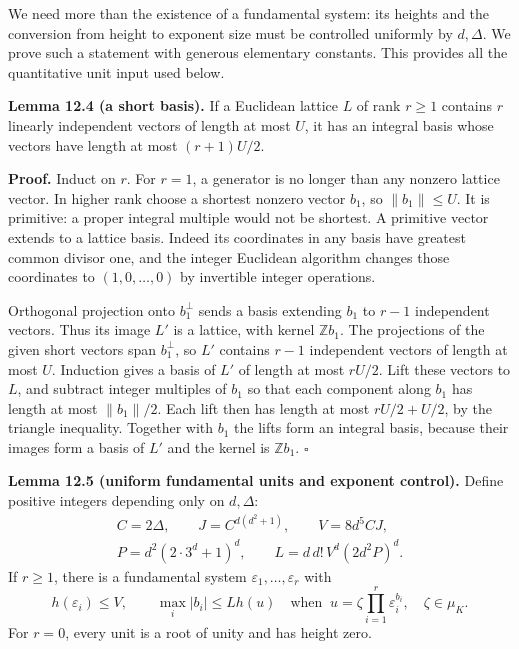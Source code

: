 \documentclass[
  11pt,
  a4paper,
]{article}
\begin{document}
We need more than the existence of a fundamental system: its heights and
the conversion from height to exponent size must be controlled uniformly
by \(d,\Delta\). We prove such a statement with generous elementary
constants. This provides all the quantitative unit input used below.

\textbf{Lemma 12.4 (a short basis).} If a Euclidean lattice \(L\) of
rank \(r\ge1\) contains \(r\) linearly independent vectors of length at
most \(U\), it has an integral basis whose vectors have length at most
\((r+1)U/2\).

\textbf{Proof.} Induct on \(r\). For \(r=1\), a generator is no longer
than any nonzero lattice vector. In higher rank choose a shortest
nonzero vector \(b_1\), so \(\|b_1\|\le U\). It is primitive: a proper
integral multiple would not be shortest. A primitive vector extends to a
lattice basis. Indeed its coordinates in any basis have greatest common
divisor one, and the integer Euclidean algorithm changes those
coordinates to \((1,0,\ldots,0)\) by invertible integer operations.

Orthogonal projection onto \(b_1^\perp\) sends a basis extending \(b_1\)
to \(r-1\) independent vectors. Thus its image \(L'\) is a lattice, with
kernel \(\mathbb Zb_1\). The projections of the given short vectors span
\(b_1^\perp\), so \(L'\) contains \(r-1\) independent vectors of length
at most \(U\). Induction gives a basis of \(L'\) of length at most
\(rU/2\). Lift these vectors to \(L\), and subtract integer multiples of
\(b_1\) so that each component along \(b_1\) has length at most
\(\|b_1\|/2\). Each lift then has length at most \(rU/2+U/2\), by the
triangle inequality. Together with \(b_1\) the lifts form an integral
basis, because their images form a basis of \(L'\) and the kernel is
\(\mathbb Zb_1\). \(\square\)

\textbf{Lemma 12.5 (uniform fundamental units and exponent control).}
Define positive integers depending only on \(d,\Delta\): \[
\begin{gathered}
C=2\Delta,\qquad J=C^{d(d^2+1)},\qquad V=8d^5CJ,\\
P=d^2(2\cdot3^d+1)^d,\qquad
L=d\,d!\,V^d(2d^2P)^d.
\end{gathered}
\tag{12.21}
\] If \(r\ge1\), there is a fundamental system
\(\varepsilon_1,\ldots,\varepsilon_r\) with \[
h(\varepsilon_i)\le V,\qquad
\max_i|b_i|\le Lh(u)
\quad\text{when }\
u=\zeta\prod_{i=1}^r\varepsilon_i^{b_i},\quad \zeta\in\mu_K.
\tag{12.22}
\] For \(r=0\), every unit is a root of unity and has height zero.
\end{document}
